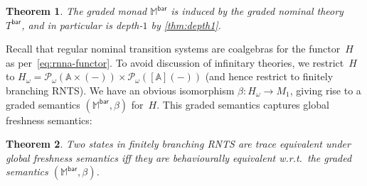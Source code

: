 \documentclass[11pt,a4paper]{amsart}
\newtheorem{theorem}{Theorem}[section]
\newcommand{\Br}{\mathsf{bar}}
\newcommand{\pre}{\mathsf{pre}}
\newcommand{\abs}{\mathsf{abs}}
\newcommand{\Term}{\mathsf{Term}}
\newcommand{\Names}{\mathbb{A}}
\newcommand{\pow}{\mathcal{P}}
\newcommand{\powf}{\pow_{\omega}}
\newcommand{\bind}[1]{\langle #1\rangle}
\theoremstyle{plain}
\newcommand{\midmid}{\hspace{0.2ex}{\rule[-0.1ex]{0.6pt}{1.65ex}}\hspace{0.2ex}}
\newcommand{\newletter}[1]{{\midmid}#1}
\numberwithin{equation}{section}
\newcommand{\monad}{{\mathbb{M}}}
\newcommand{\+}[1]{\mathcal{#1}\xspace}
\theoremstyle{definition}
\begin{document}
\begin{theorem}\label{thm:global-freshness-monad}
  The graded monad $\monad^\Br$ is induced by the graded nominal
  theory~$T^\Br$, and in particular is depth-$1$ by \cref{thm:depth1}.
\end{theorem}

Recall that regular nominal transition systems are coalgebras for the
functor~$H$ as per~\eqref{eq:rnna-functor}. To avoid discussion of
infinitary theories, we restrict~$H$ to
$H_\omega=\powf(\Names\times(-))\times\powf([\Names](-))$ (and hence
restrict to finitely branching RNTS). We
have an obvious isomorphism $\beta\colon H_\omega\to M_1$, giving
rise to a graded semantics $(\monad^\Br,\beta)$ for~$H$. This graded
semantics captures global freshness semantics:

\begin{theorem}\label{thm:global-freshness}
  Two states in finitely branching RNTS are trace equivalent under
  global freshness semantics iff they are behaviourally equivalent
  w.r.t.~the graded semantics $(\monad^\Br,\beta)$.
\end{theorem}
\end{document}
